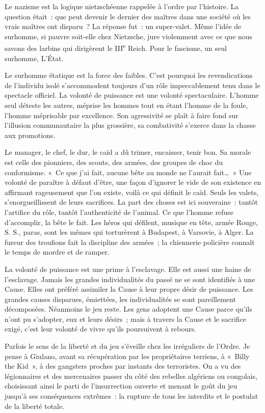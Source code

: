 \documentclass[french,twoside]{book} %
\begin{document}
Le nazisme est la logique nietzschéenne rappelée à l’ordre par l’histoire. La question était : que peut devenir le dernier des maîtres dans une société où les vrais maîtres ont disparu ? La réponse fut : un super-valet. Même l’idée de surhomme, si pauvre soit-elle chez Nietzsche, jure violemment avec ce que nous savons des larbins qui dirigèrent le III\textsuperscript{e} Reich. Pour le fascisme, un seul surhomme, L’État.\par
Le surhomme étatique est la force des faibles. C’est pourquoi les revendications de l’individu isolé s’accommodent toujours d’un rôle impeccablement tenu dans le spectacle officiel. La volonté de puissance est une volonté spectaculaire. L’homme seul déteste les autres, méprise les hommes tout en étant l’homme de la foule, l’homme méprisable par excellence. Son agressivité se plaît à faire fond sur l’illusion communautaire la plus grossière, sa combativité s’exerce dans la chasse aux promotions.\par
Le manager, le chef, le dur, le caïd a dû trimer, encaisser, tenir bon. Sa morale est celle des pionniers, des scouts, des armées, des groupes de choc du conformisme. « Ce que j’ai fait, aucune bête au monde ne l’aurait fait… » Une volonté de paraître à défaut d’être, une façon d’ignorer le vide de son existence en affirmant rageusement que l’on existe, voilà ce qui définit le caïd. Seuls les valets, s’enorgueillissent de leurs sacrifices. La part des choses est ici souveraine : tantôt l’artifice du rôle, tantôt l’authenticité de l’animal. Ce que l’homme refuse d’accomplir, la bête le fait. Les héros qui défilent, musique en tête, armée Rouge, S. S., paras, sont les mêmes qui torturèrent à Budapest, à Varsovie, à Alger. La fureur des troufions fait la discipline des armées ; la chiennerie policière connaît le temps de mordre et de ramper.\par
La volonté de puissance est une prime à l’esclavage. Elle est aussi une haine de l’esclavage. Jamais les grandes individualités du passé ne se sont identifiés à une Cause. Elles ont préféré assimiler la Cause à leur propre désir de puissance. Les grandes causes disparues, émiettées, les individualités se sont pareillement décomposées. Néanmoins le jeu reste. Les gens adoptent une Cause parce qu’ils n’ont pu s’adopter, eux et leurs désirs ; mais à travers la Cause et le sacrifice exigé, c’est leur volonté de vivre qu’ils poursuivent à rebours.\par
Parfois le sens de la liberté et du jeu s’éveille chez les irréguliers de l’Ordre. Je pense à Giulano, avant sa récupération par les propriétaires terriens, à « Billy the Kid », à des gangsters proches par instants des terroristes. On a vu des légionnaires et des mercenaires passer du côté des rebelles algériens ou congolais, choisissant ainsi le parti de l’insurrection ouverte et menant le goût du jeu jusqu’à ses conséquences extrêmes : la rupture de tous les interdits et le postulat de la liberté totale.\par
\end{document}
